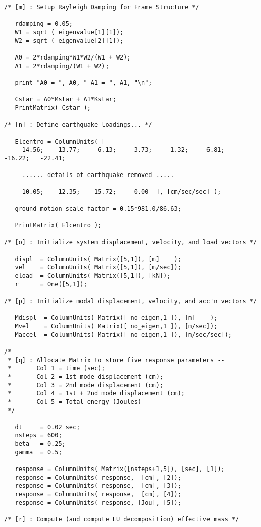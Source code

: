 \begin{footnotesize}
\begin{verbatim}
/* [m] : Setup Rayleigh Damping for Frame Structure */ 

   rdamping = 0.05;
   W1 = sqrt ( eigenvalue[1][1]);
   W2 = sqrt ( eigenvalue[2][1]);

   A0 = 2*rdamping*W1*W2/(W1 + W2);
   A1 = 2*rdamping/(W1 + W2);

   print "A0 = ", A0, " A1 = ", A1, "\n";

   Cstar = A0*Mstar + A1*Kstar;
   PrintMatrix( Cstar );

/* [n] : Define earthquake loadings... */ 

   Elcentro = ColumnUnits( [
     14.56;    13.77;     6.13;     3.73;     1.32;    -6.81;   -16.22;   -22.41;

     ...... details of earthquake removed .....

    -10.05;   -12.35;   -15.72;     0.00  ], [cm/sec/sec] );

   ground_motion_scale_factor = 0.15*981.0/86.63;

   PrintMatrix( Elcentro );

/* [o] : Initialize system displacement, velocity, and load vectors */

   displ  = ColumnUnits( Matrix([5,1]), [m]    );
   vel    = ColumnUnits( Matrix([5,1]), [m/sec]);
   eload  = ColumnUnits( Matrix([5,1]), [kN]);
   r      = One([5,1]);

/* [p] : Initialize modal displacement, velocity, and acc'n vectors */

   Mdispl  = ColumnUnits( Matrix([ no_eigen,1 ]), [m]    );
   Mvel    = ColumnUnits( Matrix([ no_eigen,1 ]), [m/sec]);
   Maccel  = ColumnUnits( Matrix([ no_eigen,1 ]), [m/sec/sec]);

/* 
 * [q] : Allocate Matrix to store five response parameters --
 *       Col 1 = time (sec);
 *       Col 2 = 1st mode displacement (cm);
 *       Col 3 = 2nd mode displacement (cm);
 *       Col 4 = 1st + 2nd mode displacement (cm);
 *       Col 5 = Total energy (Joules)
 */ 

   dt     = 0.02 sec;
   nsteps = 600;
   beta   = 0.25;
   gamma  = 0.5;

   response = ColumnUnits( Matrix([nsteps+1,5]), [sec], [1]);
   response = ColumnUnits( response,  [cm], [2]);
   response = ColumnUnits( response,  [cm], [3]);
   response = ColumnUnits( response,  [cm], [4]);
   response = ColumnUnits( response, [Jou], [5]);

/* [r] : Compute (and compute LU decomposition) effective mass */


\end{verbatim}
\end{footnotesize}
